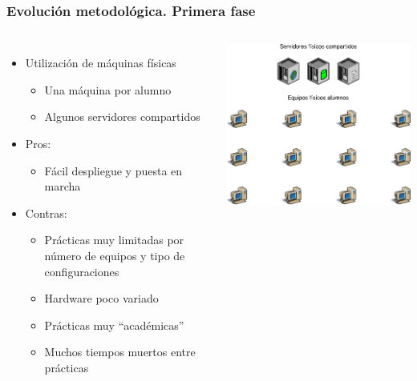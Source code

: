 \documentclass{beamer}
\begin{document}
\begin{frame}
  \frametitle{Evolución metodológica. Primera fase}
  \begin{columns}
    \begin{itemize}
    \item Utilización de máquinas físicas
      \begin{itemize}
      \item Una máquina por alumno
      \item Algunos servidores compartidos
      \end{itemize}
      \item Pros:
      \begin{itemize}
      \item Fácil despliegue y puesta en marcha
      \end{itemize}
      \item Contras:
      \begin{itemize}
      \item Prácticas muy limitadas por número de equipos y tipo de
        configuraciones
      \item Hardware poco variado
      \item Prácticas muy ``académicas''
      \item Muchos tiempos muertos entre prácticas
      \end{itemize}
    \end{itemize}
    \includegraphics[width=\columnwidth]{../img/epoca1.png}
  \end{columns}
\end{frame}
\end{document}
